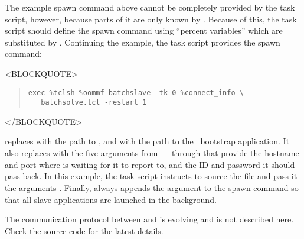 The example spawn command above cannot be completely provided by
the task script, however, because parts of it are only known
by .  Because of this, the task script should
define the spawn command using ``percent variables'' which are
substituted by .  Continuing the example, the task
script provides the spawn command:
\begin{rawhtml}<BLOCKQUOTE>\end{rawhtml}
\begin{quote}
\begin{verbatim}
exec %tclsh %oommf batchslave -tk 0 %connect_info \
   batchsolve.tcl -restart 1
\end{verbatim}
\end{quote}
\begin{rawhtml}</BLOCKQUOTE>\end{rawhtml}
 replaces  with the path to ,
and  with the path to the \OOMMF\ bootstrap application.  
It also replaces  with the five arguments from \verb+--+
through  that provide 
the hostname and port where  is waiting for
it to report to, and the ID and password it should pass back.
In this example, the task script instructs  to source the
file  and pass it the arguments .
Finally,  always appends the argument \cd{\&} to
the spawn command so that all slave applications are launched in the
background.

The communication protocol between
 and  is evolving and is not
described here.  Check the source code for the latest details.

